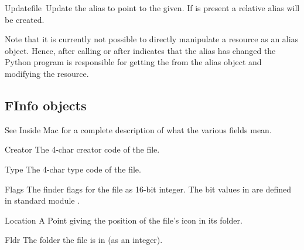 
\begin{funcdesc}{Update}{file\, }
Update the alias to point to the  given. If  is
present a relative alias will be created.
\end{funcdesc}

Note that it is currently not possible to directly manipulate a resource
as an alias object. Hence, after calling  or after
 indicates that the alias has changed the Python program
is responsible for getting the  from the alias object and
modifying the resource.


\subsection{FInfo objects}

See Inside Mac for a complete description of what the various fields
mean.

\renewcommand{\indexsubitem}{(FInfo object attribute)}
\begin{datadesc}{Creator}
The 4-char creator code of the file.
\end{datadesc}

\begin{datadesc}{Type}
The 4-char type code of the file.
\end{datadesc}

\begin{datadesc}{Flags}
The finder flags for the file as 16-bit integer. The bit values in
 are defined in standard module .
\end{datadesc}

\begin{datadesc}{Location}
A Point giving the position of the file's icon in its folder.
\end{datadesc}

\begin{datadesc}{Fldr}
The folder the file is in (as an integer).
\end{datadesc}
